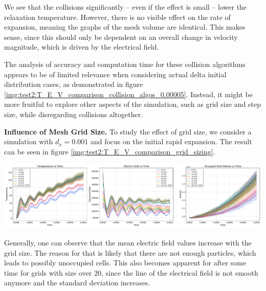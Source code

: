 We see that the collisions significantly -- even if the effect is small -- lower the relaxation temperature. However, there is no visible effect on the rate of expansion, meaning the graphs of the mesh volume are identical. This makes sense, since this should only be dependent on an overall change in velocity magnitude, which is driven by the electrical field.

The analysis of accuracy and computation time for these collision algorithms appears to be of limited relevance when considering actual delta initial distribution cases, as demonstrated in figure \ref{img:test2:T_E_V_comparison_collision_algos_0.00005}. Instead, it might be more fruitful to explore other aspects of the simulation, such as grid size and step size, while disregarding collisions altogether. 

\textbf{Influence of Mesh Grid Size.} To study the effect of grid size, we consider a simulation with $d_x = 0.001$ and focus on the initial rapid expansion. The result can be seen in figure \ref{img:test2:T_E_V_comparison_grid_sizing}. \\
\begin{minipage}[h]{\linewidth}
    \vspace{5pt}
    \centering
    \includegraphics[width=\linewidth]{ressources/test2/T_E_V_comparison_grid_sizing.pdf}
    \label{img:test2:T_E_V_comparison_grid_sizing}
    \vspace{5pt}
\end{minipage}
Generally, one can observe that the mean electric field values increase with the grid size. The reason for that is likely that there are not enough particles, which leads to possibly unoccupied cells. This also becomes apparent for after some time for grids with size over $20$, since the line of the electrical field is not smooth anymore and the standard deviation increases. 

